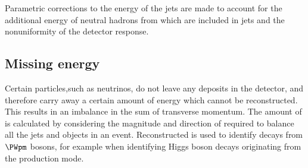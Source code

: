 Parametric corrections to the energy of the jets are made to account for the additional energy of \PF neutral hadrons from \PU which are included in jets and the nonuniformity of the detector response.

\ifNewAnalysis
\subsection{Missing energy}

Certain particles,such as neutrinos, do not leave any deposits in the detector, and therefore carry away a certain amount of energy which cannot be reconstructed. This results in an imbalance in the sum of transverse momentum. The amount of \MET is calculated by considering the magnitude and direction of \pT required to balance all the jets and \PF objects in an event. Reconstructed \MET is used to identify decays from $\PWpm$ bosons, for example when identifying Higgs boson decays originating from the \WH production mode.\fi

